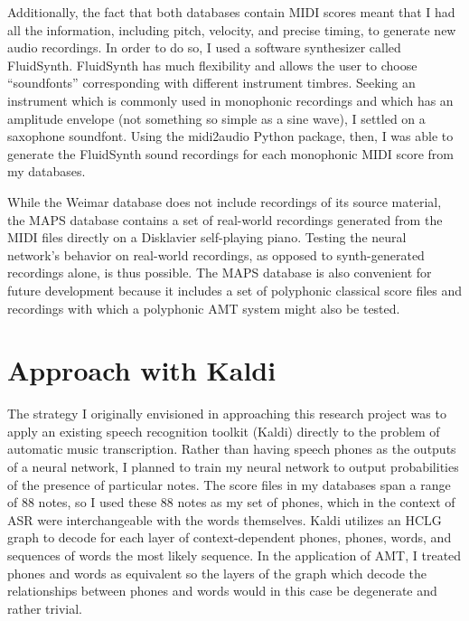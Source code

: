 \documentclass[conference]{IEEEtran}
\begin{document}
Additionally, the fact that both databases contain MIDI scores meant that I had all the information, including pitch, velocity, and precise timing, to generate new audio recordings. In order to do so, I used a software synthesizer called FluidSynth. FluidSynth has much flexibility and allows the user to choose ``soundfonts'' corresponding with different instrument timbres. Seeking an instrument which is commonly used in monophonic recordings and which has an amplitude envelope (not something so simple as a sine wave), I settled on a saxophone soundfont. Using the midi2audio Python package, then, I was able to generate the FluidSynth sound recordings for each monophonic MIDI score from my databases. 

While the Weimar database does not include recordings of its source material, the MAPS database contains a set of real-world recordings generated from the MIDI files directly on a Disklavier self-playing piano. Testing the neural network's behavior on real-world recordings, as opposed to synth-generated recordings alone, is thus possible. The MAPS database is also convenient for future development because it includes a set of polyphonic classical score files and recordings with which a polyphonic AMT system might also be tested.

\section{Approach with Kaldi}

The strategy I originally envisioned in approaching this research project was to apply an existing speech recognition toolkit (Kaldi) directly to the problem of automatic music transcription. Rather than having speech phones as the outputs of a neural network, I planned to train my neural network to output probabilities of the presence of particular notes. The score files in my databases span a range of 88 notes, so I used these 88 notes as my set of phones, which in the context of ASR were interchangeable with the words themselves. Kaldi utilizes an HCLG graph to decode for each layer of context-dependent phones, phones, words, and sequences of words the most likely sequence. In the application of AMT, I treated phones and words as equivalent so the layers of the graph which decode the relationships between phones and words would in this case be degenerate and rather trivial.
\end{document}
